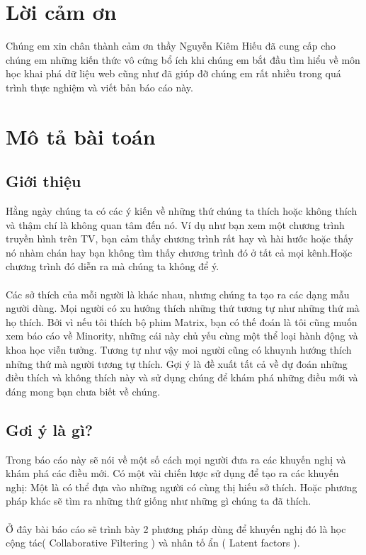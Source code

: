 \documentclass[a4paper,10pt]{report}
\begin{document}
\chapter*{Lời cảm ơn}
Chúng em xin chân thành cảm ơn thầy Nguyễn Kiêm Hiếu đã cung cấp cho chúng em những kiến thức vô cứng bổ ích khi chúng em bắt đầu tìm hiểu về môn học khai phá dữ liệu web cũng như đã giúp đỡ chúng em rất nhiều trong quá trình thực nghiệm và viết bản báo cáo này.
\chapter{Mô tả bài toán}
\section{Giới thiệu}
Hằng ngày chúng ta có các ý kiến về những thứ chúng ta thích hoặc không thích và thậm chí là không quan tâm đến nó. Ví dụ như bạn xem một chương trình truyền hình trên TV, bạn cảm thấy chương trình rất hay và hài hước hoặc thấy nó nhàm chán hay bạn không tìm thấy chương trình đó ở tất cả mọi kênh.Hoặc chương trình đó diễn ra mà chúng ta không để ý.\\ \\
Các sở thích của mỗi người là khác nhau, nhưng chúng ta tạo ra các dạng mẫu người dùng. Mọi người có xu hướng thích những thứ tương tự như những thứ mà họ thích. Bởi vì nếu tôi thích bộ phim Matrix, bạn có thế đoán là tôi cũng muốn xem báo cáo về  Minority, những cái này chủ yếu cùng một thể loại hành động và khoa học viễn tưởng. Tương tự như vậy moi người cũng có khuynh hướng thích những thứ mà người tương tự thích. Gợi ý là đề xuất tất cả về dự đoán những điều thích và không thích này và sử dụng chúng để khám phá những điều mới và đáng mong bạn chưa biết về chúng.
\section{Gơi ý là gì?}
Trong báo cáo này sẽ nói về một số cách mọi người đưa ra các khuyến nghị và khám phá các điều mới. Có một vài chiến lược sử dụng để tạo ra các khuyến nghị: Một là có thể đựa vào những người có cùng thị hiếu sở thích. Hoặc phương pháp khác sẽ tìm ra những thứ giống như những gì chúng ta đã thích.\\ \\
Ở đây bài báo cáo sẽ trình bày 2 phương pháp dùng để khuyến nghị đó là học cộng tác( Collaborative Filtering ) và nhân tố ẩn ( Latent factors ).
\newpage
\end{document}
